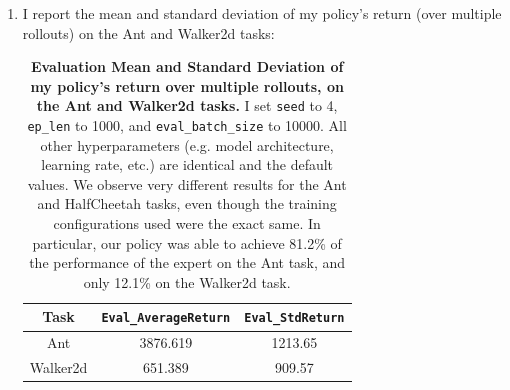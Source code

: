 \documentclass[12pt]{article}
\begin{document}
\begin{enumerate}
  \item I report the mean and standard deviation of my policy's return (over multiple rollouts) on the Ant and Walker2d tasks:
  \begin{table}[h!]
    \begin{center}
    \begin{tabular}{|c|c|c|}
      \hline
      Task & \texttt{Eval\_AverageReturn} & \texttt{Eval\_StdReturn} \\
      \hline
      Ant & 3876.619 & 1213.65 \\ 
      Walker2d & 651.389 & 909.57 \\
      \hline
    \end{tabular}
    \caption{\textbf{Evaluation Mean and Standard Deviation of my policy's return over multiple rollouts, on the Ant and Walker2d tasks.}
    I set \texttt{seed} to 4, \texttt{ep\_len} to 1000, and \texttt{eval\_batch\_size} to 10000. All other hyperparameters (e.g. model architecture, learning rate, etc.) are identical and the default values.
    We observe very different results for the Ant and HalfCheetah tasks, even though the training configurations used were the exact same. In particular, our policy was able to achieve 81.2\% of the performance of the expert on the Ant task, and only 12.1\% on the Walker2d task.}
  \end{center}
  \end{table}


\end{enumerate}
\end{document}
